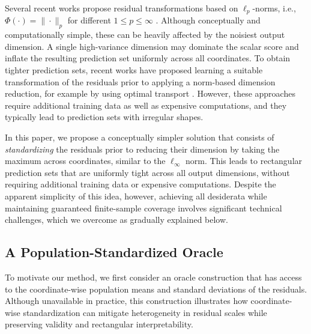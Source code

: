 {\color{brown}Several recent works propose residual transformations based on $\ell_p$-norms, i.e., $\Phi(\cdot) = \|\cdot\|_p$ for different $1\leq p \leq \infty$ \citep{johnstone2022exact}. Although conceptually and computationally simple, these can be heavily affected by the noisiest output dimension. A single high-variance dimension may dominate the scalar score and inflate the resulting prediction set uniformly across all coordinates. 
To obtain tighter prediction sets, recent works have proposed learning a suitable transformation of the residuals prior to applying a norm-based dimension reduction, for example by using optimal transport \citep{thurin2025otcp, klein2025multivariate}.
However, these approaches require additional training data as well as expensive computations, and they typically lead to prediction sets with irregular shapes.}

In this paper, we propose a conceptually simpler solution that consists of {\em standardizing} the residuals prior to reducing their dimension by taking the maximum across coordinates, similar to the $\ell_\infty$ norm. This leads to rectangular prediction sets that are uniformly tight across all output dimensions, without requiring additional training data or expensive computations.
Despite the apparent simplicity of this idea, however, achieving all desiderata while maintaining guaranteed finite-sample coverage involves significant technical challenges, which we overcome as gradually explained below.


\subsection{A Population-Standardized Oracle}
\label{sec:pop-oracle}
 
To motivate our method, we first consider an oracle construction that has access to the coordinate-wise population means and standard deviations of the residuals. 
Although unavailable in practice, this
construction illustrates how coordinate-wise standardization can mitigate heterogeneity in residual scales while preserving validity and rectangular interpretability.


